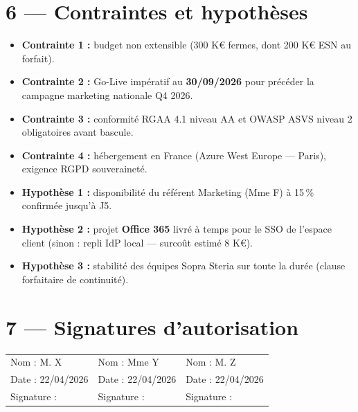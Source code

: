 \documentclass[11pt,a4paper,oneside]{report}
\begin{document}
\section*{6 --- Contraintes et hypothèses}

\begin{itemize}
  \item \textbf{Contrainte 1 :} budget non extensible (300 K€ fermes, dont 200 K€ ESN au forfait).
  \item \textbf{Contrainte 2 :} Go-Live impératif au \textbf{30/09/2026} pour précéder la campagne marketing nationale Q4 2026.
  \item \textbf{Contrainte 3 :} conformité RGAA 4.1 niveau AA et OWASP ASVS niveau 2 obligatoires avant bascule.
  \item \textbf{Contrainte 4 :} hébergement en France (Azure West Europe — Paris), exigence RGPD souveraineté.
  \item \textbf{Hypothèse 1 :} disponibilité du référent Marketing (Mme F) à 15\,\% confirmée jusqu'à J5.
  \item \textbf{Hypothèse 2 :} projet \textbf{Office 365} livré à temps pour le SSO de l'espace client (sinon : repli IdP local — surcoût estimé 8 K€).
  \item \textbf{Hypothèse 3 :} stabilité des équipes Sopra Steria sur toute la durée (clause forfaitaire de continuité).
\end{itemize}

\section*{7 --- Signatures d'autorisation}

\vspace{1cm}
\renewcommand{\arraystretch}{2}
\begin{tabularx}{\textwidth}{Y Y Y}
\toprule
{} &  &  \\
\midrule
Nom : M. X & Nom : Mme Y & Nom : M. Z \\
Date : 22/04/2026 & Date : 22/04/2026 & Date : 22/04/2026 \\
Signature : & Signature : & Signature : \\
\bottomrule
\end{tabularx}
\end{document}
